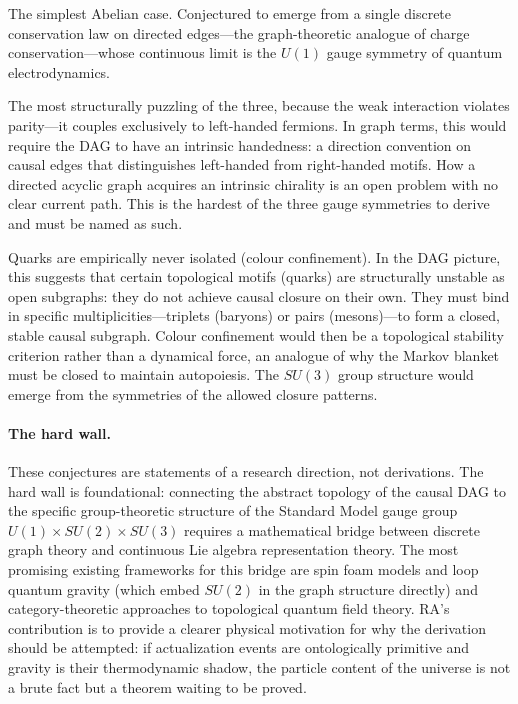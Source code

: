 \documentclass[11pt,a4paper]{article}
\theoremstyle{plain}
\theoremstyle{definition}
\theoremstyle{remark}
\begin{document}
\begin{description}[leftmargin=1.5em]
  \item[\textbf{Electromagnetism ($U(1)$)}] The simplest Abelian case.
  Conjectured to emerge from a single discrete conservation law on directed
  edges---the graph-theoretic analogue of charge conservation---whose
  continuous limit is the $U(1)$ gauge symmetry of quantum electrodynamics.

  \item[\textbf{The Weak Force ($SU(2)$) and Chirality}] The most
  structurally puzzling of the three, because the weak interaction violates
  parity---it couples exclusively to left-handed fermions. In graph terms, this
  would require the DAG to have an intrinsic handedness: a direction convention
  on causal edges that distinguishes left-handed from right-handed motifs. How a
  directed acyclic graph acquires an intrinsic chirality is an open problem with
  no clear current path. This is the hardest of the three gauge symmetries to
  derive and must be named as such.

  \item[\textbf{The Strong Force ($SU(3)$) and Confinement}] Quarks are
  empirically never isolated (colour confinement). In the DAG picture, this
  suggests that certain topological motifs (quarks) are structurally unstable as
  open subgraphs: they do not achieve causal closure on their own. They must
  bind in specific multiplicities---triplets (baryons) or pairs (mesons)---to
  form a closed, stable causal subgraph. Colour confinement would then be a
  topological stability criterion rather than a dynamical force, an analogue of
  why the Markov blanket must be closed to maintain autopoiesis. The $SU(3)$
  group structure would emerge from the symmetries of the allowed closure
  patterns.
\end{description}

\paragraph{The hard wall.}
These conjectures are statements of a research direction, not derivations. The
hard wall is foundational: connecting the abstract topology of the causal DAG to
the specific group-theoretic structure of the Standard Model gauge group
$U(1) \times SU(2) \times SU(3)$ requires a mathematical bridge between discrete
graph theory and continuous Lie algebra representation theory. The most promising
existing frameworks for this bridge are spin foam models and loop quantum gravity
(which embed $SU(2)$ in the graph structure directly) and category-theoretic
approaches to topological quantum field theory. RA's contribution is to provide
a clearer physical motivation for why the derivation should be attempted: if
actualization events are ontologically primitive and gravity is their thermodynamic
shadow, the particle content of the universe is not a brute fact but a theorem
waiting to be proved.
\end{document}
